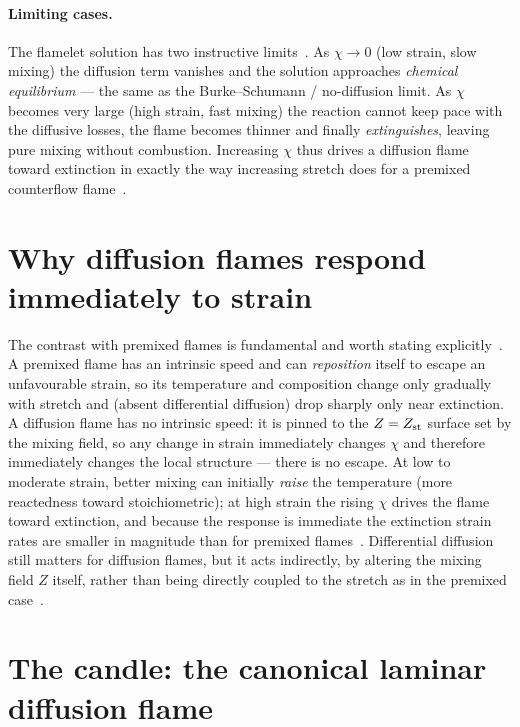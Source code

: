 \paragraph{Limiting cases.} The flamelet solution has two instructive limits~\cite{lecture9,transcript_l9}. As $\chi\to0$ (low strain, slow mixing) the diffusion term vanishes and the solution approaches \emph{chemical equilibrium} --- the same as the Burke--Schumann / no-diffusion limit. As $\chi$ becomes very large (high strain, fast mixing) the reaction cannot keep pace with the diffusive losses, the flame becomes thinner and finally \emph{extinguishes}, leaving pure mixing without combustion. Increasing $\chi$ thus drives a diffusion flame toward extinction in exactly the way increasing stretch does for a premixed counterflow flame~\cite{lecture9}.

\section{Why diffusion flames respond immediately to strain}

The contrast with premixed flames is fundamental and worth stating explicitly~\cite{lecture9,transcript_l9}. A premixed flame has an intrinsic speed and can \emph{reposition} itself to escape an unfavourable strain, so its temperature and composition change only gradually with stretch and (absent differential diffusion) drop sharply only near extinction. A diffusion flame has no intrinsic speed: it is pinned to the $Z=Z_{\mathrm{st}}$ surface set by the mixing field, so any change in strain immediately changes $\chi$ and therefore immediately changes the local structure --- there is no escape. At low to moderate strain, better mixing can initially \emph{raise} the temperature (more reactedness toward stoichiometric); at high strain the rising $\chi$ drives the flame toward extinction, and because the response is immediate the extinction strain rates are smaller in magnitude than for premixed flames~\cite{lecture9}. Differential diffusion still matters for diffusion flames, but it acts indirectly, by altering the mixing field $Z$ itself, rather than being directly coupled to the stretch as in the premixed case~\cite{lecture9,transcript_l9}.

\section{The candle: the canonical laminar diffusion flame}

